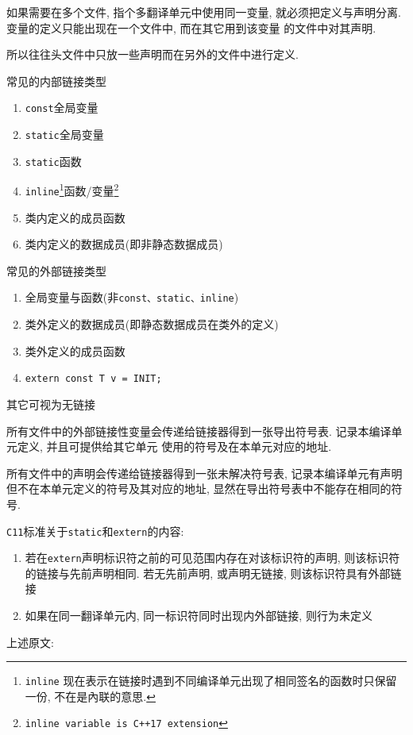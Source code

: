 \documentclass[10pt,twoside]{ctexart}
\begin{document}
如果需要在多个文件, 指个多翻译单元中使用同一变量, 就必须把定义与声明分离. 变量的定义只能出现在一个文件中, 而在其它用到该变量
	的文件中对其声明.

所以往往头文件中只放一些声明而在另外的文件中进行定义.

\begin{paracol}{2}
	\begin{leftcolumn}
		常见的内部链接类型
		\begin{enumerate}
			\item {\tt const}全局变量
			\item {\tt static}全局变量
			\item {\tt static}函数
			\item {\tt inline}\footnote[1]{{\tt inline} 现在表示在链接时遇到不同编译单元出现了相同签名的函数时只保留一份, 不在是內联的意思.}函数/变量\footnote[2]{{\tt inline variable is C++17 extension}}
			\item 类内定义的成员函数
			\item 类内定义的数据成员(即非静态数据成员)
		\end{enumerate}
	\end{leftcolumn}
	\begin{rightcolumn}
		常见的外部链接类型
		\begin{enumerate}
			\item 全局变量与函数(非{\tt const、static、inline})
			\item 类外定义的数据成员(即静态数据成员在类外的定义)
			\item 类外定义的成员函数
			\item {\tt extern const T v = INIT;}
		\end{enumerate}
	\end{rightcolumn}
\end{paracol}
其它可视为无链接

\vspace{1em}
所有文件中的外部链接性变量会传递给链接器得到一张导出符号表. 记录本编译单元定义, 并且可提供给其它单元
	使用的符号及在本单元对应的地址. 

所有文件中的声明会传递给链接器得到一张未解决符号表, 记录本编译单元有声明但不在本单元定义的符号及其对应的地址, 
	显然在导出符号表中不能存在相同的符号.

{\tt C11}标准关于{\tt static}和{\tt extern}的内容:
\begin{enumerate}
	\item 若在{\tt extern}声明标识符之前的可见范围内存在对该标识符的声明, 则该标识符的链接与先前声明相同. 
			若无先前声明, 或声明无链接, 则该标识符具有外部链接
	\item 如果在同一翻译单元内, 同一标识符同时出现内外部链接, 则行为未定义
\end{enumerate}
上述原文:
\end{document}
